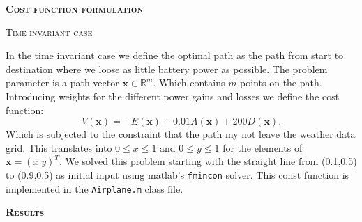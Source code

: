 \documentclass[10pt,a4paper]{article}
\newenvironment{buik}
{\begin{multicols}{3}}
{\end{multicols}}
\renewcommand{\section}[1]{%
    \par\vspace{.3cm}\noindent\textbf{\textsc{#1}}%
    \par\noindent\ignorespaces%
}
\renewcommand{\subsection}[1]{%
    \par\vspace{.3cm}\noindent\textsc{#1}%
    \par\noindent\ignorespaces%
}
\begin{document}
\begin{buik}
\section{Cost function formulation}
\subsection{Time invariant case}
In the time invariant case we define the optimal path as the path from start to destination where we loose as little battery power as possible. The problem parameter is a path vector $\mathbf{x} \in \mathbb{R}^m$. Which contains $m$ points on the path. Introducing weights for the different power gains and losses we define the cost function:
\begin{equation}
V(\mathbf{x}) = - E(\mathbf{x}) +0.01A(\mathbf{x}) + 200D(\mathbf{x}).
\end{equation}
Which is subjected to the constraint that the path my not leave the weather data grid. This translates into $0 \leq x \leq 1$ and $0 \leq y \leq 1$ for the elements of $\mathbf{x} = (x \; y)^T$. We solved this problem starting with the straight line from (0.1,0.5) to (0.9,0.5) as initial input using matlab's \texttt{fmincon} solver. This const function is implemented in the \texttt{Airplane.m} class file.
\end{buik}

\section{Results}
\end{document}
